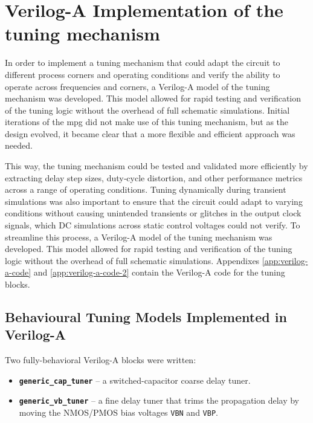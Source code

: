 \section{Verilog-A Implementation of the tuning mechanism}\label{sec:RTL_tuning}
In order to implement a tuning mechanism that could adapt the circuit to different process corners and operating conditions and verify the ability to operate across frequencies and corners, a Verilog-A model of the tuning mechanism was developed. This model allowed for rapid testing and verification of the tuning logic without the overhead of full schematic simulations. Initial iterations of the \gls{mpg} did not make use of this tuning mechanism, but as the design evolved, it became clear that a more flexible and efficient approach was needed.

This way, the tuning mechanism could be tested and validated more efficiently by extracting delay step sizes, duty‑cycle distortion, and other performance metrics across a range of operating conditions. Tuning dynamically during transient simulations was also important to ensure that the circuit could adapt to varying conditions without causing unintended transients or glitches in the output clock signals, which DC simulations across static control voltages could not verify.
To streamline this process, a Verilog-A model of the tuning mechanism was developed. This model allowed for rapid testing and verification of the tuning logic without the overhead of full schematic simulations. Appendixes \ref{app:verilog-a-code} and \ref{app:verilog-a-code-2} contain the Verilog-A code for the tuning blocks.

\subsection{Behavioural Tuning Models Implemented in Verilog-A}
\label{sec:Verilog-A_tuners}

Two fully-behavioral Verilog-A blocks were written:

\begin{itemize}
  \item \textbf{\texttt{generic\_cap\_tuner}} – a switched-capacitor coarse delay tuner.
  \item \textbf{\texttt{generic\_vb\_tuner}} – a fine delay tuner that trims the propagation delay by moving the NMOS/PMOS bias voltages \texttt{VBN} and \texttt{VBP}.
\end{itemize}

